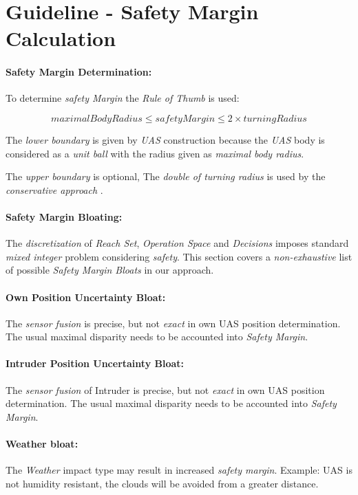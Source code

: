 \newpage
\section{Guideline - Safety Margin Calculation}\label{s:safetyMarginCalculation}
\paragraph{Safety Margin Determination:} To determine \emph{safety Margin} the \emph{Rule of Thumb} is used:

\begin{equation}
    maximal Body Radius \le safety Margin \le 2 \times turning Radius
\end{equation}

\noindent The \emph{lower boundary} is given by \emph{UAS} construction because the \emph{UAS} body is considered as a \emph{unit ball} with the radius given as \emph{maximal body radius}. 

The \emph{upper boundary} is optional, The \emph{double of \emph{turning radius}} is used by the \emph{conservative approach} \cite{borenstein1991vector}.


\paragraph{Safety Margin Bloating:}  The \emph{discretization} of \emph{Reach Set}, \emph{Operation Space} and \emph{Decisions} imposes standard \emph{mixed integer} problem considering \emph{safety}. This section covers a \emph{non-exhaustive} list of possible \emph{Safety Margin Bloats} in our approach.

\paragraph{Own Position Uncertainty Bloat:} The \emph{sensor fusion} is precise, but not \emph{exact} in own UAS position determination. The usual maximal disparity needs to be accounted into \emph{Safety Margin}.

\paragraph{Intruder Position Uncertainty Bloat:} The \emph{sensor fusion} of Intruder is precise, but not \emph{exact} in own UAS position determination. The usual maximal disparity needs to be accounted into \emph{Safety Margin}.

\paragraph{Weather bloat:} The \emph{Weather} impact type may result in increased \emph{safety margin}. Example: UAS is not humidity resistant, the clouds will be avoided from a greater distance.

